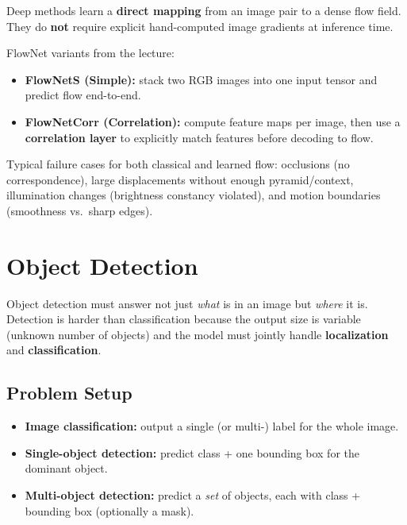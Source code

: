 \documentclass[11pt, oneside]{book}
\begin{document}
\begin{thmbox}[title={Reprojection Error Minimization}]
\begin{defbox}[title={Correlation and Convolution}]
\begin{defbox}[title={ReLU and Pooling}]
\begin{defbox}[title={Segmentation}]
\begin{defbox}[title={Graph-Based Segmentation}]
\begin{defbox}[title={U-Net}]
Deep methods learn a \textbf{direct mapping} from an image pair to a dense flow field.
They do \textbf{not} require explicit hand-computed image gradients at inference time.

FlowNet variants from the lecture:
\begin{itemize}
  \item \textbf{FlowNetS (Simple):} stack two RGB images into one input tensor and predict flow end-to-end.
  \item \textbf{FlowNetCorr (Correlation):} compute feature maps per image, then use a \textbf{correlation layer}
        to explicitly match features before decoding to flow.
\end{itemize}

\begin{notebox}[title={Exam Trap}]
Typical failure cases for both classical and learned flow:
occlusions (no correspondence), large displacements without enough pyramid/context,
illumination changes (brightness constancy violated), and motion boundaries (smoothness vs.\ sharp edges).
\end{notebox}


\chapter{Object Detection}

Object detection must answer not just \emph{what} is in an image but \emph{where} it is.
Detection is harder than classification because the output size is variable (unknown number of objects)
and the model must jointly handle \textbf{localization} and \textbf{classification}.

\section{Problem Setup}

\begin{itemize}
  \item \textbf{Image classification:} output a single (or multi-) label for the whole image.
  \item \textbf{Single-object detection:} predict class + one bounding box for the dominant object.
  \item \textbf{Multi-object detection:} predict a \emph{set} of objects, each with class + bounding box (optionally a mask).
\end{itemize}


\end{defbox}
\end{defbox}
\end{defbox}
\end{defbox}
\end{defbox}
\end{thmbox}
\end{document}
